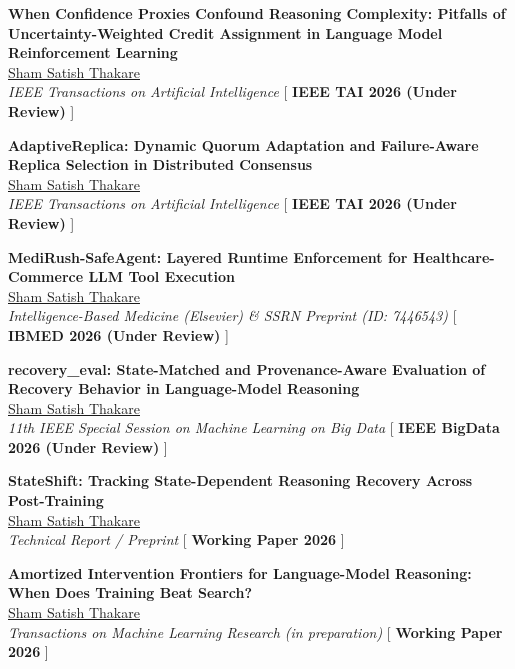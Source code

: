 \documentclass[10pt,letterpaper]{article}
\begin{document}
\begin{enumerate}[label={[\arabic*]}]
    \item \textbf{When Confidence Proxies Confound Reasoning Complexity: Pitfalls of Uncertainty-Weighted Credit Assignment in Language Model Reinforcement Learning} \\
    \underline{Sham Satish Thakare} \\
    \textit{IEEE Transactions on Artificial Intelligence} \hfill [ \textbf{IEEE TAI 2026 (Under Review)} ]

    \item \textbf{AdaptiveReplica: Dynamic Quorum Adaptation and Failure-Aware Replica Selection in Distributed Consensus} \\
    \underline{Sham Satish Thakare} \\
    \textit{IEEE Transactions on Artificial Intelligence} \hfill [ \textbf{IEEE TAI 2026 (Under Review)} ]

    \item \textbf{MediRush-SafeAgent: Layered Runtime Enforcement for Healthcare-Commerce LLM Tool Execution} \\
    \underline{Sham Satish Thakare} \\
    \textit{Intelligence-Based Medicine (Elsevier) \& SSRN Preprint (ID: 7446543)} \hfill [ \textbf{IBMED 2026 (Under Review)} ]

    \item \textbf{recovery\_eval: State-Matched and Provenance-Aware Evaluation of Recovery Behavior in Language-Model Reasoning} \\
    \underline{Sham Satish Thakare} \\
    \textit{11th IEEE Special Session on Machine Learning on Big Data} \hfill [ \textbf{IEEE BigData 2026 (Under Review)} ]

    \item \textbf{StateShift: Tracking State-Dependent Reasoning Recovery Across Post-Training} \\
    \underline{Sham Satish Thakare} \\
    \textit{Technical Report / Preprint} \hfill [ \textbf{Working Paper 2026} ]

    \item \textbf{Amortized Intervention Frontiers for Language-Model Reasoning: When Does Training Beat Search?} \\
    \underline{Sham Satish Thakare} \\
    \textit{Transactions on Machine Learning Research (in preparation)} \hfill [ \textbf{Working Paper 2026} ]
\end{enumerate}
\end{document}
